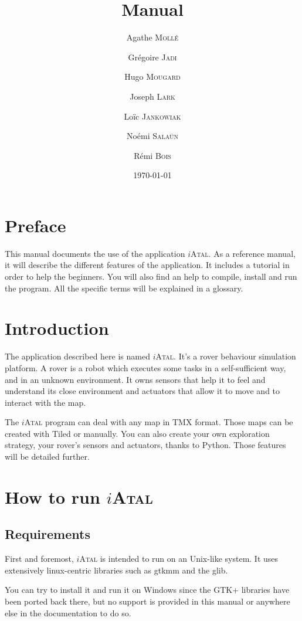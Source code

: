 \documentclass[a4paper,11pt]{article}
\title{\iAtal{} Manual}
\author{Agathe \textsc{Mollé}
  \and Grégoire \textsc{Jadi}
  \and Hugo \textsc{Mougard}
  \and Joseph \textsc{Lark} 
  \and Loïc \textsc{Jankowiak}
  \and Noémi \textsc{Salaün}
  \and Rémi \textsc{Bois}}
\date{\today}
\newcommand\iAtal{$i$\textsc{Atal}}
\begin{document}
\maketitle

\tableofcontents



\section*{Preface}
This manual documents the use of the application \iAtal{}.  As a
reference manual, it will describe the different features of the
application. It includes a tutorial in order to help the
beginners. You will also find an help to compile, install and run the
program.  All the specific terms will be explained in a glossary.

\section*{Introduction}
The application described here is named \iAtal{}. It's a rover behaviour
simulation platform.  A rover is a robot which executes some tasks in
a self-sufficient way, and in an unknown environment.  It owns sensors
that help it to feel and understand its close environment and
actuators that allow it to move and to interact with the map.


The \iAtal{} program can deal with any map in TMX\cite{tmx}
format. Those maps can be created with Tiled\cite{tiled} or manually.
You can also create your own exploration strategy, your rover's
sensors and actuators, thanks to Python.  Those features will be
detailed further.

\section{How to run \iAtal{}}

\subsection{Requirements}
First and foremost, \iAtal{} is intended to run on an Unix-like
system. It uses extensively linux-centric libraries such as gtkmm and
the glib.

You can try to install it and run it on Windows since the GTK+
libraries have been ported back there, but no support is provided in
this manual or anywhere else in the documentation to do so.
\end{document}
